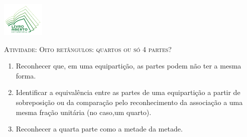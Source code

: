 \documentclass[10 pt,usenames,dvipsnames, oneside]{article}
\begin{document}
\begin{center}
  \begin{minipage}[l]{3cm}
\includegraphics[width=2cm]{logo}    
\end{minipage}\hfill
\begin{minipage}[r]{.8\textwidth}
 {\Large \scshape Atividade: Oito retângulos: quartos ou só 4 partes?}  
\end{minipage}
\end{center}
\vspace{.2cm}

\ifdefined\prof
\begin{goals}
\begin{enumerate}

    \item       Reconhecer que, em uma equipartição, as partes podem não ter a mesma forma.
    \item       Identificar a equivalência entre as partes de uma equipartição a partir de sobreposição ou da comparação pelo reconhecimento da associação a uma mesma fração unitária (no caso,um quarto).
    \item       Reconhecer a quarta parte como a metade da metade.


\end{enumerate}
\end{goals}
\end{document}
